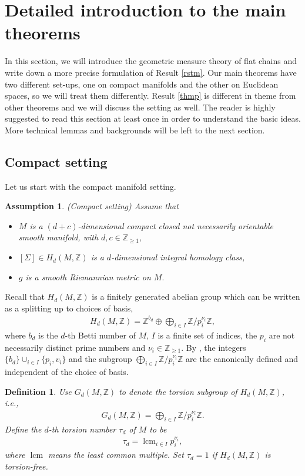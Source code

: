 \documentclass[11pt,a4paper]{amsart}
\numberwithin{equation}{section}
\newcommand{\Si}{\Sigma}
\newcommand{\Z}{\mathbb{Z}}
\theoremstyle{plain}
\newtheorem{assump}{Assumption}[subsection]
\newtheorem{defn}{Definition}[subsection]
\theoremstyle{definition}
\numberwithin{equation}{subsection}
\begin{document}
\section{Detailed introduction to the main theorems}\label{secmt}In this section, we will introduce the geometric measure theory of flat chains and write down a more precise formulation of Result \ref{rstm}. Our main theorems have two different set-ups, one on compact manifolds and the other on Euclidean spaces, so we will treat them differently. Result  \ref{thmp} is different in theme from other theorems and we will discuss the setting as well. The reader is highly suggested to read this section at least once in order to understand the basic ideas. More technical lemmas and backgrounds will be left to the next section. 
\subsection{Compact setting}\label{secmtc}Let us start with the compact manifold setting.
\begin{assump}\label{assumpm}(Compact setting)	Assume that 
	\begin{itemize}
		\item $M$ is a $(d+c)$-dimensional compact closed not necessarily orientable smooth manifold, with $d,c\in\Z_{\ge 1},$
		\item $[\Si]\in H_d(M,\Z)$ is a $d$-dimensional integral homology class,
		\item $g$ is a smooth Riemannian metric on $M.$
\end{itemize} \end{assump}Recall \cite{AH} that $H_d(M,\Z)$ is a finitely generated abelian group which can be written as a splitting up to choices of basis,
\begin{align}\label{decomph}
H_d(M,\Z)=\Z^{b_d}\oplus\bigoplus_{i\in I}\Z/p_i^{\nu_i}\Z,
\end{align}where $b_d$ is the $d$-th Betti number of $M$, $I$ is a finite set of indices, the $p_i$ are not necessarily distinct prime numbers and $\nu_i\in \Z_{\ge 1}$. By \cite[Theorem 1.57(c)]{JMgt}, the integers $\{b_d\}\cup_{i\in I}\{p_i,v_i\}$ and the subgroup $\bigoplus_{i\in I}\Z/p_i^{\nu_i}\Z$ are the canonically defined and independent of the choice of basis. \begin{defn}\label{defntm}
Use $G_d(M,\Z)$ to denote the torsion subgroup of $H_d(M,\Z)$, i.e., 
\begin{align*}
G_d(M,\Z)=\bigoplus_{i\in I}\Z/p_i^{\nu_i}\Z.
\end{align*}Define the $d$-th torsion number $\tau_d$ of $M$ to be
\begin{align*}
\tau_d=\operatorname{lcm}_{i\in I}p_i^{\nu_i},
\end{align*}where $\operatorname{lcm}$ means the 
least common multiple. Set $\tau_d=1$ if $H_d(M,\Z)$ is torsion-free. 
\end{defn}
\end{document}
